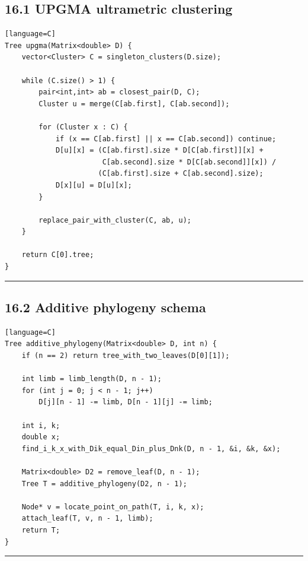 \documentclass[11pt]{article}
\begin{document}
\subsection{16.1 UPGMA ultrametric clustering}\label{upgma-ultrametric-clustering}

\begin{verbatim}[language=C]
Tree upgma(Matrix<double> D) {
    vector<Cluster> C = singleton_clusters(D.size);

    while (C.size() > 1) {
        pair<int,int> ab = closest_pair(D, C);
        Cluster u = merge(C[ab.first], C[ab.second]);

        for (Cluster x : C) {
            if (x == C[ab.first] || x == C[ab.second]) continue;
            D[u][x] = (C[ab.first].size * D[C[ab.first]][x] +
                       C[ab.second].size * D[C[ab.second]][x]) /
                      (C[ab.first].size + C[ab.second].size);
            D[x][u] = D[u][x];
        }

        replace_pair_with_cluster(C, ab, u);
    }

    return C[0].tree;
}
\end{verbatim}

\begin{center}\rule{0.5\linewidth}{0.5pt}\end{center}

\subsection{16.2 Additive phylogeny schema}\label{additive-phylogeny-schema}

\begin{verbatim}[language=C]
Tree additive_phylogeny(Matrix<double> D, int n) {
    if (n == 2) return tree_with_two_leaves(D[0][1]);

    int limb = limb_length(D, n - 1);
    for (int j = 0; j < n - 1; j++)
        D[j][n - 1] -= limb, D[n - 1][j] -= limb;

    int i, k;
    double x;
    find_i_k_x_with_Dik_equal_Din_plus_Dnk(D, n - 1, &i, &k, &x);

    Matrix<double> D2 = remove_leaf(D, n - 1);
    Tree T = additive_phylogeny(D2, n - 1);

    Node* v = locate_point_on_path(T, i, k, x);
    attach_leaf(T, v, n - 1, limb);
    return T;
}
\end{verbatim}

\begin{center}\rule{0.5\linewidth}{0.5pt}\end{center}
\end{document}
